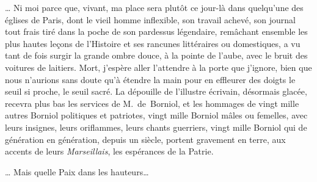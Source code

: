 \documentclass[french,twoside]{book} %
\newcommand{\astertri}{\medskip\par\centerline{\color{rubric}\large\selectfont{\syms ✻\,✻\,✻}}\medskip\par}%
\begin{document}
\astertri

\noindent … Ni moi parce que, vivant, ma place sera plutôt ce jour-là dans quelqu’une des églises de Paris, dont le vieil homme inflexible, son travail achevé, son journal tout frais tiré dans la poche de son pardessus légendaire, remâchant ensemble les plus hautes leçons de l’Histoire et ses rancunes littéraires ou domestiques, a vu tant de fois surgir la grande ombre douce, à la pointe de l’aube, avec le bruit des voitures de laitiers. Mort, j’espère aller l’attendre à la porte que j’ignore, bien que nous n’aurions sans doute qu’à étendre la main pour en effleurer des doigts le seuil si proche, le seuil sacré. La dépouille de l’illustre écrivain, désormais glacée, recevra plus bas les services de M. de Borniol, et les hommages de vingt mille autres Borniol politiques et patriotes, vingt mille Borniol mâles ou femelles, avec leurs insignes, leurs oriflammes, leurs chants guerriers, vingt mille Borniol qui de génération en génération, depuis un siècle, portent gravement en terre, aux accents de leurs \emph{Marseillais}, les espérances de la Patrie.\par
… Mais quelle Paix dans les hauteurs…
\end{document}
